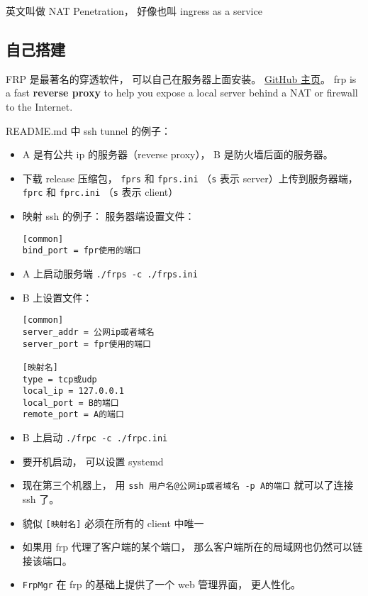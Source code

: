 
\begin{issues}
\issueDraft
\end{issues}

英文叫做 NAT Penetration， 好像也叫 ingress as a service

\subsection{自己搭建}
FRP 是最著名的穿透软件， 可以自己在服务器上面安装。 \href{https://github.com/fatedier/frp}{GitHub 主页}。
frp is a fast \textbf{reverse proxy} to help you expose a local server behind a NAT or firewall to the Internet.

README.md 中 ssh tunnel 的例子：
\begin{itemize}
\item A 是有公共 ip 的服务器（reverse proxy）， B 是防火墙后面的服务器。
\item 下载 release 压缩包， \verb|fprs| 和 \verb|fprs.ini| （\verb|s| 表示 server）上传到服务器端， \verb|fprc| 和 \verb|fprc.ini| （\verb|s| 表示 client）
\item 映射 ssh 的例子： 服务器端设置文件：
\begin{lstlisting}[language=none,caption=fprs.ini]
[common]
bind_port = fpr使用的端口
\end{lstlisting}
\item A 上启动服务端 \verb|./frps -c ./frps.ini|
\item B 上设置文件：
\begin{lstlisting}[language=none,caption=fprc.ini]
[common]
server_addr = 公网ip或者域名
server_port = fpr使用的端口

[映射名]
type = tcp或udp
local_ip = 127.0.0.1
local_port = B的端口
remote_port = A的端口
\end{lstlisting}
\item B 上启动 \verb|./frpc -c ./frpc.ini|
\item 要开机启动， 可以设置 systemd
\item 现在第三个机器上， 用 \verb|ssh 用户名@公网ip或者域名 -p A的端口| 就可以了连接 ssh 了。
\item 貌似 \verb|[映射名]| 必须在所有的 client 中唯一
\item 如果用 frp 代理了客户端的某个端口， 那么客户端所在的局域网也仍然可以链接该端口。
\item \verb|FrpMgr| 在 frp 的基础上提供了一个 web 管理界面， 更人性化。
\end{itemize}


